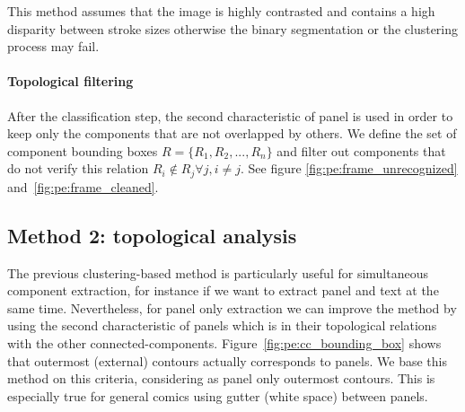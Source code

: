 This method assumes that the image is highly contrasted and contains a high disparity between stroke sizes otherwise the binary segmentation or the clustering process may fail.

\paragraph{Topological filtering} %
\label{par:topological_filtering}
After the classification step, the second characteristic of panel is used in order to keep only the components that are not overlapped by others.
We define the set of component bounding boxes $R = \{R_1, R_2, ... , R_n\}$ and filter out components that do not verify this relation $R_i\notin{R_j} \forall j, i \neq j$.
See figure \ref{fig:pe:frame_unrecognized} and~\ref{fig:pe:frame_cleaned}.






\subsection{Method 2: topological analysis} %
\label{sub:outermost_contour_filtering}
The previous clustering-based method is particularly useful for simultaneous component extraction, for instance if we want to extract panel and text at the same time.
Nevertheless, for panel only extraction we can improve the method by using the second characteristic of panels which is in their topological relations with the other connected-components.
Figure~\ref{fig:pe:cc_bounding_box} shows that outermost (external) contours actually corresponds to panels.
We base this method on this criteria, considering as panel only outermost contours.
This is especially true for general comics using gutter (white space) between panels.

